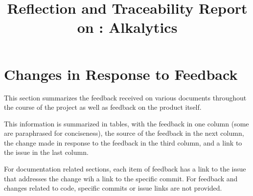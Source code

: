 \documentclass{article}
\title{Reflection and Traceability Report on \progname: Alkalytics}
\author{\authname}
\date{}
\begin{document}
\maketitle


\section{Changes in Response to Feedback}
This section summarizes the feedback received on various documents throughout
the course of the project as well as feedback on the product itself.

This information is summarized in tables, with the feedback in one column (some
are paraphrased for conciseness), the source of the feedback in the next column,
the change made in response to the feedback in the third column, and a link to
the issue in the last column. 

For documentation related sections, each item of feedback has a link to the
issue that addresses the change wih a link to the specific commit. For feedback
and changes related to code, specific commits or issue links are not provided.



\end{document}
